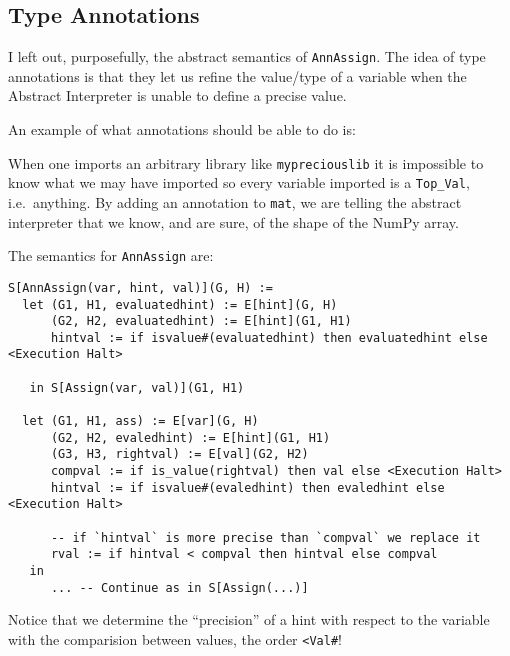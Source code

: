 \subsection{Type Annotations}\label{type-annotations}

I left out, purposefully, the abstract semantics of \texttt{AnnAssign}.
The idea of type annotations is that they let us refine the value/type
of a variable when the Abstract Interpreter is unable to define a
precise value.

An example of what annotations should be able to do is:

\begin{Shaded}
\begin{Highlighting}[]

\NormalTok{mat: NdArray[}\NormalTok{,}\NormalTok{,}\NormalTok{,}\NormalTok{] }\OperatorTok{=}
\OperatorTok{=}\OperatorTok{+} \OperatorTok{*}\NormalTok{, }\NormalTok{))  }
\OperatorTok{=}\NormalTok{, }\NormalTok{)))  }
\end{Highlighting}
\end{Shaded}

When one imports an arbitrary library like \texttt{mypreciouslib} it is
impossible to know what we may have imported so every variable imported
is a \texttt{Top\_Val}, i.e.~anything. By adding an annotation to
\texttt{mat}, we are telling the abstract interpreter that we know, and
are sure, of the shape of the NumPy array.

The semantics for \texttt{AnnAssign} are:

\begin{verbatim}
S[AnnAssign(var, hint, val)](G, H) :=
  let (G1, H1, evaluatedhint) := E[hint](G, H)
      (G2, H2, evaluatedhint) := E[hint](G1, H1)
      hintval := if isvalue#(evaluatedhint) then evaluatedhint else <Execution Halt>

   in S[Assign(var, val)](G1, H1)

  let (G1, H1, ass) := E[var](G, H)
      (G2, H2, evaledhint) := E[hint](G1, H1)
      (G3, H3, rightval) := E[val](G2, H2)
      compval := if is_value(rightval) then val else <Execution Halt>
      hintval := if isvalue#(evaledhint) then evaledhint else <Execution Halt>

      -- if `hintval` is more precise than `compval` we replace it
      rval := if hintval < compval then hintval else compval
   in
      ... -- Continue as in S[Assign(...)]
\end{verbatim}

Notice that we determine the \enquote{precision} of a hint with respect
to the variable with the comparision between values, the order
\texttt{\textless{}Val\#}!
